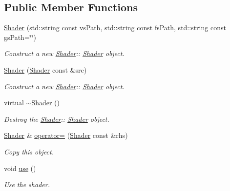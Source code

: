 \subsection*{Public Member Functions}
\begin{DoxyCompactItemize}
\item 
\hyperlink{class_shader_af52cfbd48a8697db80c29647d26591d8}{Shader} (std\+::string const vs\+Path, std\+::string const fs\+Path, std\+::string const gs\+Path=\char`\"{}\char`\"{})
\begin{DoxyCompactList}\small\item\em Construct a new \hyperlink{class_shader}{Shader}\+:\+: \hyperlink{class_shader}{Shader} object. \end{DoxyCompactList}\item 
\hyperlink{class_shader_a07225cfd40e5dd0201391a06e3293dfb}{Shader} (\hyperlink{class_shader}{Shader} const \&src)
\begin{DoxyCompactList}\small\item\em Construct a new \hyperlink{class_shader}{Shader}\+:\+: \hyperlink{class_shader}{Shader} object. \end{DoxyCompactList}\item 
\mbox{\label{class_shader_aff01df87e8a102f270b5b135a295e59d}} 
virtual \hyperlink{class_shader_aff01df87e8a102f270b5b135a295e59d}{$\sim$\+Shader} ()
\begin{DoxyCompactList}\small\item\em Destroy the \hyperlink{class_shader}{Shader}\+:\+: \hyperlink{class_shader}{Shader} object. \end{DoxyCompactList}\item 
\hyperlink{class_shader}{Shader} \& \hyperlink{class_shader_a831ae46853cdfcf35e5265df41d93aea}{operator=} (\hyperlink{class_shader}{Shader} const \&rhs)
\begin{DoxyCompactList}\small\item\em Copy this object. \end{DoxyCompactList}\item 
\mbox{\label{class_shader_a870fa9f13d69e558815d6fd351a469dc}} 
void \hyperlink{class_shader_a870fa9f13d69e558815d6fd351a469dc}{use} ()
\begin{DoxyCompactList}\small\item\em Use the shader. \end{DoxyCompactList}\item 

\end{DoxyCompactItemize}
